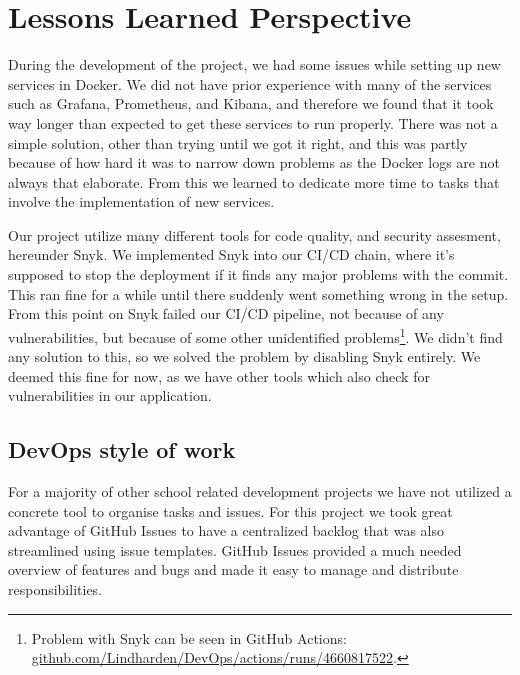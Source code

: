 \section{Lessons Learned Perspective} \label{sec:lessons}

During the development of the project, we had some issues while setting up new services in Docker. We did not have prior experience with many of the services such as Grafana, Prometheus, and Kibana, and therefore we found that it took way longer than expected to get these services to run properly. There was not a simple solution, other than trying until we got it right, and this was partly because of how hard it was to narrow down problems as the Docker logs are not always that elaborate. From this we learned to dedicate more time to tasks that involve the implementation of new services.

Our project utilize many different tools for code quality, and security assesment, hereunder Snyk. We implemented Snyk into our CI/CD chain, where it's supposed to stop the deployment if it finds any major problems with the commit. This ran fine for a while until there suddenly went something wrong in the setup. From this point on Snyk failed our CI/CD pipeline, not because of any vulnerabilities, but because of some other unidentified problems\footnote{Problem with Snyk can be seen in GitHub Actions: \href{https://github.com/Lindharden/DevOps/actions/runs/4660817522/jobs/8261515084?pr=98}{github.com/Lindharden/DevOps/actions/runs/4660817522}.}. We didn't find any solution to this, so we solved the problem by disabling Snyk entirely. We deemed this fine for now, as we have other tools which also check for vulnerabilities in our application.

\subsection{DevOps style of work}
For a majority of other school related development projects we have not utilized a concrete tool to organise tasks and issues. For this project we took great advantage of GitHub Issues to have a centralized backlog that was also streamlined using issue templates. GitHub Issues provided a much needed overview of features and bugs and made it easy to manage and distribute responsibilities.

